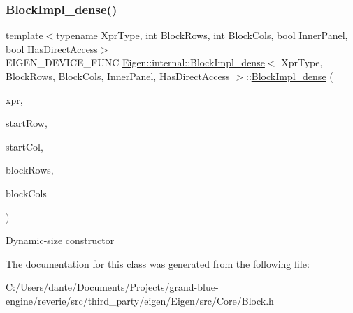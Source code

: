 \subsubsection{\texorpdfstring{BlockImpl\_dense()}{BlockImpl\_dense()}\hspace{0.1cm}{\footnotesize\ttfamily [3/3]}}
{\footnotesize\ttfamily template$<$typename Xpr\+Type, int Block\+Rows, int Block\+Cols, bool Inner\+Panel, bool Has\+Direct\+Access$>$ \\
E\+I\+G\+E\+N\+\_\+\+D\+E\+V\+I\+C\+E\+\_\+\+F\+U\+NC \mbox{\hyperlink{class_eigen_1_1internal_1_1_block_impl__dense}{Eigen\+::internal\+::\+Block\+Impl\+\_\+dense}}$<$ Xpr\+Type, Block\+Rows, Block\+Cols, Inner\+Panel, Has\+Direct\+Access $>$\+::\mbox{\hyperlink{class_eigen_1_1internal_1_1_block_impl__dense}{Block\+Impl\+\_\+dense}} (\begin{DoxyParamCaption}\item[{Xpr\+Type \&}]{xpr,  }\item[{Index}]{start\+Row,  }\item[{Index}]{start\+Col,  }\item[{Index}]{block\+Rows,  }\item[{Index}]{block\+Cols }\end{DoxyParamCaption})\hspace{0.3cm}{\ttfamily [inline]}}

Dynamic-\/size constructor 

The documentation for this class was generated from the following file\+:\begin{DoxyCompactItemize}
\item 
C\+:/\+Users/dante/\+Documents/\+Projects/grand-\/blue-\/engine/reverie/src/third\+\_\+party/eigen/\+Eigen/src/\+Core/Block.\+h\end{DoxyCompactItemize}
